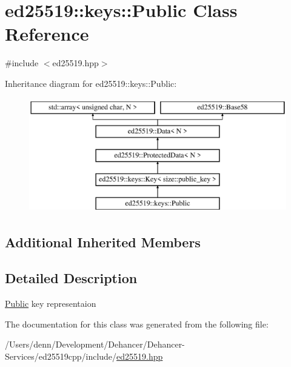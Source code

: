 \hypertarget{classed25519_1_1keys_1_1_public}{}\section{ed25519\+:\+:keys\+:\+:Public Class Reference}
\label{classed25519_1_1keys_1_1_public}


{\ttfamily \#include $<$ed25519.\+hpp$>$}

Inheritance diagram for ed25519\+:\+:keys\+:\+:Public\+:\begin{figure}[H]
\begin{center}
\leavevmode
\includegraphics[height=5.000000cm]{classed25519_1_1keys_1_1_public}
\end{center}
\end{figure}
\subsection*{Additional Inherited Members}


\subsection{Detailed Description}
\mbox{\hyperlink{classed25519_1_1keys_1_1_public}{Public}} key representaion 

The documentation for this class was generated from the following file\+:\begin{DoxyCompactItemize}
\item 
/\+Users/denn/\+Development/\+Dehancer/\+Dehancer-\/\+Services/ed25519cpp/include/\mbox{\hyperlink{ed25519_8hpp}{ed25519.\+hpp}}\end{DoxyCompactItemize}
